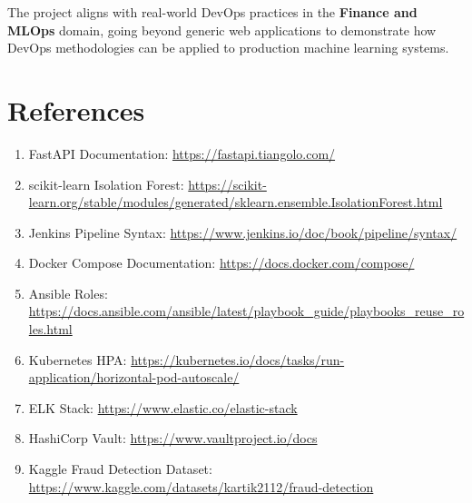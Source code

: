 \documentclass[12pt,a4paper]{article}
\begin{document}
The project aligns with real-world DevOps practices in the \textbf{Finance and MLOps} domain, going beyond generic web applications to demonstrate how DevOps methodologies can be applied to production machine learning systems.


\section*{References}

\begin{enumerate}
    \item FastAPI Documentation: \url{https://fastapi.tiangolo.com/}
    \item scikit-learn Isolation Forest: \url{https://scikit-learn.org/stable/modules/generated/sklearn.ensemble.IsolationForest.html}
    \item Jenkins Pipeline Syntax: \url{https://www.jenkins.io/doc/book/pipeline/syntax/}
    \item Docker Compose Documentation: \url{https://docs.docker.com/compose/}
    \item Ansible Roles: \url{https://docs.ansible.com/ansible/latest/playbook_guide/playbooks_reuse_roles.html}
    \item Kubernetes HPA: \url{https://kubernetes.io/docs/tasks/run-application/horizontal-pod-autoscale/}
    \item ELK Stack: \url{https://www.elastic.co/elastic-stack}
    \item HashiCorp Vault: \url{https://www.vaultproject.io/docs}
    \item Kaggle Fraud Detection Dataset: \url{https://www.kaggle.com/datasets/kartik2112/fraud-detection}
\end{enumerate}
\end{document}
